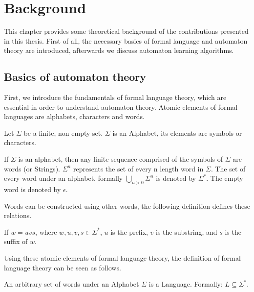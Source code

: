 \chapter{Background}

This chapter provides some theoretical background of the contributions presented in this thesis. First of all, the necessary basics of formal language and automaton theory are introduced, afterwards we discuss automaton learning algorithms.

\section{Basics of automaton theory}

First, we introduce the fundamentals of formal language theory, which are essential in order to understand automaton theory. Atomic elements of formal languages are alphabets, characters and words.

\begin{definition}[Alphabet]
	Let $\Sigma$ be a finite, non-empty set. $\Sigma$ is an Alphabet, its elements are symbols or characters.
\end{definition}

\begin{definition}[Word]
	If $\Sigma$ is an alphabet, then any finite sequence comprised of the symbols of $\Sigma$ are words (or Strings). $\Sigma^{n}$ represents the set of every n length word in $\Sigma$. The set of every word under an alphabet, formally $\bigcup\limits_{n>0}^{} \Sigma^{n}$ is denoted by $\Sigma^{*}$. The empty word is denoted by $\epsilon$.
\end{definition}

Words can be constructed using other words, the following definition defines these relations.

\begin{definition}
	If $w = uvs$, where $w, u, v, s\in\Sigma^*$, $u$ is the prefix, $v$ is the substring, and $s$ is the suffix of $w$.
\end{definition}

Using these atomic elements of formal language theory, the definition of formal language theory can be seen as follows.

\begin{definition}
	An arbitrary set of words under an Alphabet $\Sigma$ is a Language. Formally: $L\subseteq\Sigma^{*}$.
\end{definition}

